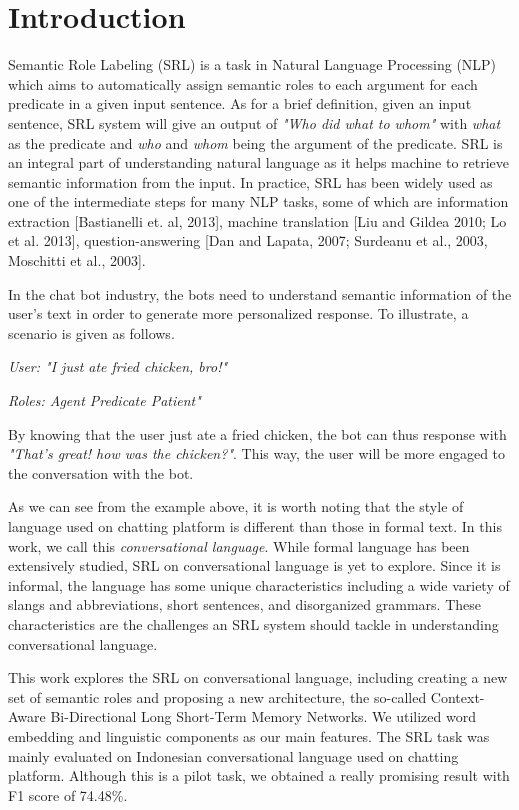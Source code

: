 \section{Introduction}
Semantic Role Labeling (SRL) is a task in Natural Language Processing (NLP) which aims to automatically assign semantic roles to each argument for each predicate in a given input sentence. As for a brief definition, given an input sentence, SRL system will give an output of \textit{"Who did what to whom"} with \textit{what} as the predicate and \textit{who} and \textit{whom} being the argument of the predicate. SRL is an integral part of understanding natural language as it helps machine to retrieve semantic information from the input. In practice, SRL has been widely used as one of the intermediate steps for many NLP tasks, some of which are information extraction [Bastianelli et. al, 2013], machine translation [Liu and Gildea 2010; Lo et al. 2013], question-answering [Dan and Lapata, 2007; Surdeanu et al., 2003, Moschitti et al., 2003].

In the chat bot industry, the bots need to understand semantic information of the user's text in order to generate more personalized response. To illustrate, a scenario is given as follows.

\textit{User: "I just ate fried chicken, bro!"}

\textit{Roles: Agent Predicate Patient"}

By knowing that the user just ate a fried chicken, the bot can thus response with \textit{"That's great! how was the chicken?"}. This way, the user will be more engaged to the conversation with the bot.

As we can see from the example above, it is worth noting that the style of language used on chatting platform is different than those in formal text. In this work, we call this \textit{conversational language}. While formal language has been extensively studied, SRL on conversational language is yet to explore. Since it is informal, the language has some unique characteristics including a wide variety of slangs and abbreviations, short sentences, and disorganized grammars. These characteristics are the challenges an SRL system should tackle in understanding conversational language.

This work explores the SRL on conversational language, including creating a new set of semantic roles and proposing a new architecture, the so-called Context-Aware Bi-Directional Long Short-Term Memory Networks. We utilized word embedding and linguistic components as our main features. The SRL task was mainly evaluated on Indonesian conversational language used on chatting platform. Although this is a pilot task, we obtained a really promising result with F1 score of 74.48\%.


